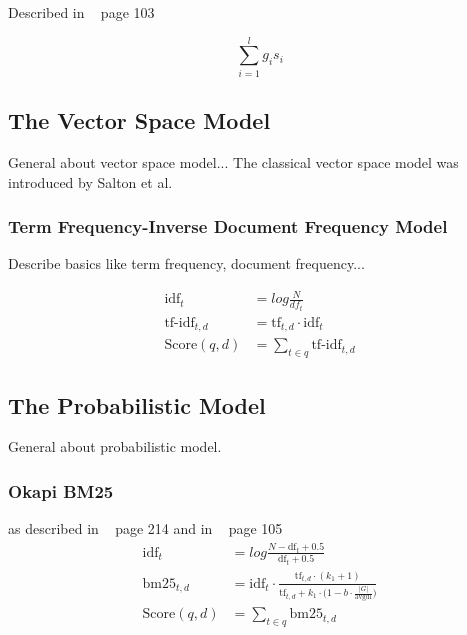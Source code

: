 Described in ~\cite{manning2008} page 103

\begin{equation}
  \sum_{i = 1}^{l}g_i s_i
\end{equation}

\subsection{The Vector Space Model}
\label{sec:the_vector_space_model}

General about vector space model... The classical vector space model was introduced by Salton et al.~\cite{salton75vsm}

\subsubsection{Term Frequency-Inverse Document Frequency Model}
\label{sec:tfidf}


Describe basics like term frequency, document frequency...

\begin{equation}
  \begin{split}
    \text{idf}_t & = log \frac{N}{df_t} \\
    \text{tf-idf}_{t, d} & = \text{tf}_{t, d} \cdot \text{idf}_t \\
    \text{Score}(q, d) & = \sum_{t \in q}\text{tf-idf}_{t, d}
  \end{split}
\end{equation}

\subsection{The Probabilistic Model}
\label{sec:the_probabilistic_model}

General about probabilistic model.

\subsubsection{Okapi BM25}
\label{sec:okapi_bm25}
as described in ~\cite{manning2008} page 214 and in ~\cite{ModernInvormationRetrieval1999} page 105
\begin{equation}
  \begin{split}
    \text{idf}_t & = log \frac{N - \text{df}_t + 0.5}{\text{df}_t + 0.5} \\
    \text{bm25}_{t, d} & = \text{idf}_t \cdot \frac{\text{tf}_{t, d} \cdot (k_1 + 1)}{\text{tf}_{t, d} + k_1 \cdot \bigl(1 - b \cdot \frac{|G|}{\text{avgdl}}\bigr)}  \\
    \text{Score}(q, d) & = \sum_{t \in q}\text{bm25}_{t, d}
  \end{split}
\end{equation}



